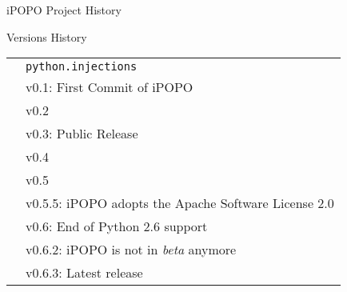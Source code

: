 \begin{frame}{iPOPO Project History}
\begin{block}{Versions History}
\centering
\begin{small}
\begin{table}
\begin{tabular}{@{\,}r <{\hskip 2pt} !{} >{\raggedright\arraybackslash}p{.5\textwidth}}
\addlinespace[1.5ex]
 & \texttt{python.injections} \\
 & v0.1: First Commit of iPOPO \\
 & v0.2 \\
 & v0.3: Public Release \\
 & v0.4 \\
 & v0.5 \\
 & v0.5.5: iPOPO adopts the Apache Software License 2.0 \\
 & v0.6: End of Python 2.6 support \\
 & v0.6.2: iPOPO is not in \textit{beta} anymore \\
 & v0.6.3: Latest release \\
\end{tabular}
\end{table}
\end{small}
\end{block}
\end{frame}
